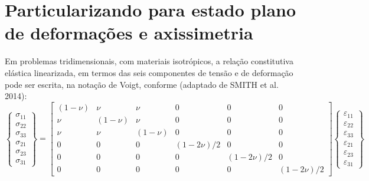\section{Particularizando para estado plano de deformações e axissimetria}
Em problemas tridimensionais, com materiais isotrópicos, a relação constitutiva elástica linearizada, em termos das seis componentes de tensão e de deformação pode ser escrita, na notação de Voigt, conforme (adaptado de SMITH et al. 2014):
\begin{equation}
	\label{eq:Dl}
	\left\{\begin{array}{lcl}
		\sigma_{11} \\
		\sigma_{22} \\
		\sigma_{33} \\
		\sigma_{21} \\
		\sigma_{23} \\
		\sigma_{31} 
	\end{array}\right\} = 
	\begin{bmatrix}
	(1-\nu)	& \nu 		& \nu  		& 0	 		& 0 			& 0 \\
	\nu 	& (1-\nu)	& \nu  		& 0		 	& 0				& 0  \\
	\nu 	& \nu 		& (1-\nu)   & 0		 	& 0 			& 0  \\
	0		& 0			& 0		    & (1-2\nu)/2 & 0 			& 0  \\
	0		& 0			& 0		    & 0	       	& (1-2\nu)/2	& 0  \\
	0		& 0			& 0		    & 0	       	& 0         	& (1-2\nu)/2
	\end{bmatrix}
	\left\{\begin{array}{lcl}
	\varepsilon_{11} \\
	\varepsilon_{22} \\
	\varepsilon_{33} \\
	\varepsilon_{21} \\
	\varepsilon_{23} \\
	\varepsilon_{31} 
\end{array}\right\}
\end{equation}

